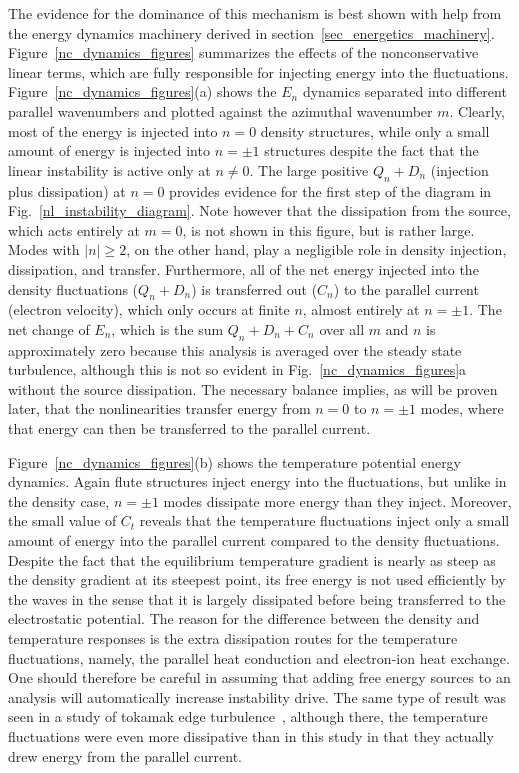 \documentclass[showpacs,preprintnumbers,amsmath,amssymb,superscriptaddress]{revtex4}
\begin{document}
The evidence for the dominance of this mechanism is best shown with
help from the energy dynamics machinery derived in section~\ref{sec_energetics_machinery}. Figure~\ref{nc_dynamics_figures} summarizes the effects of the nonconservative linear terms, which are
fully responsible for injecting energy into the fluctuations. Figure~\ref{nc_dynamics_figures}(a) shows the $E_n$ dynamics separated into different parallel wavenumbers and plotted
against the azimuthal wavenumber $m$. Clearly, most of the energy is injected into $n=0$ density structures, while only a small amount of energy is injected into
$n= \pm 1$ structures despite the fact that the linear instability is active only at $n \ne 0$. The large positive $Q_n + D_n$ (injection plus dissipation) at $n=0$ provides evidence for the first
step of the diagram in Fig.~\ref{nl_instability_diagram}. Note however that the dissipation from the source, which acts entirely at $m=0$, is not shown in this figure, but is rather large.
Modes with $|n| \ge 2$, on the other hand, play a negligible role in density injection, dissipation, and transfer. 
Furthermore, all of the net energy injected into the density fluctuations ($Q_n + D_n$) is transferred out ($C_n$) to
the parallel current (electron velocity), which only occurs at finite $n$, almost entirely at $n = \pm 1$. The net change of $E_n$, which is the sum $Q_n + D_n + C_n$ over all $m$ and $n$
is approximately zero because this analysis is averaged over the steady state turbulence, although this is not so evident in Fig.~\ref{nc_dynamics_figures}a without the source dissipation. 
The necessary balance implies, as will be proven later, that the nonlinearities transfer energy from $n=0$ to $n = \pm 1$ modes, where that energy can then
be transferred to the parallel current.

Figure~\ref{nc_dynamics_figures}(b) shows the temperature potential energy dynamics. Again flute structures inject energy into the fluctuations, but unlike in the density case, $n = \pm 1$ modes
dissipate more energy than they inject. Moreover, the small value of $C_t$ reveals that the temperature fluctuations inject only a small amount of energy into the parallel current compared
to the density fluctuations. Despite the fact that the equilibrium temperature gradient is nearly as steep as the density gradient at its steepest point, 
its free energy is not used efficiently by the waves
in the sense that it is largely dissipated before being transferred to the electrostatic potential. The reason for the difference
between the density and temperature responses is the extra dissipation routes for the temperature fluctuations, namely, the parallel heat conduction and electron-ion heat exchange.
One should therefore be careful in assuming that adding free energy sources to an analysis will automatically increase instability drive.
The same type of result was seen in a study of tokamak edge turbulence~\cite{zeiler1997}, although there, the temperature fluctuations were even more dissipative than in this study in that they
actually drew energy from the parallel current. 
\end{document}
